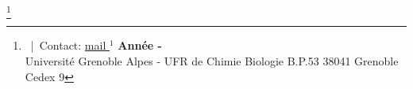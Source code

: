 \documentclass[../Master_report2.tex]{subfiles}
\begin{document}
\begin{titlepage}
\noindent
\begin{minipage}{1.8in}

\end{minipage}
\hfill
\begin{minipage}{3.55in}
\makeatletter
\@labadr
\makeatother
\end{minipage}

\begin{figure}[h]
\begin{center}
\makeatletter
\@pict
\makeatother
\end{center}
\end{figure}
\thispagestyle{empty}


\renewcommand{\footnoterule}{%
  \kern -3pt
  \hrule width \textwidth height 1pt
  \kern 2pt
}


\let\thefootnote\relax\makeatletter\footnote{{%
\@credpict
~|~Contact:  \href{mailto:\@email%
}{mail $^1$}} 
\hfill \textbf{Année \the\year-\the\year}\\
Université Grenoble Alpes - UFR de Chimie Biologie B.P.53 38041 Grenoble Cedex 9}
\makeatother


\end{titlepage}

\biblio
\end{document}
